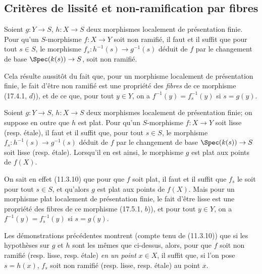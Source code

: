 
\subsection{Critères de lissité et non-ramification par fibres}
\label{IV.17.8}

\begin{proposition}[17.8.1]
\label{IV.17.8.1}
Soient $g:Y\to S$, $h:X\to S$ deux morphismes localement de présentation finie. Pour qu'un $S$-morphisme $f:X\to Y$ soit non ramifié, il faut et il suffit que pour tout $s\in S$, le morphisme $f_s:h^{-1}(s)\to g^{-1}(s)$ déduit de $f$ par le changement de base $\Spec(k(s))\to S$, soit non ramifié.
\end{proposition}

Cela résulte aussitôt du fait que, pour un morphisme localement de présentation finie, le fait d'être non ramifié est une propriété des \emph{fibres} de ce morphisme (17.4.1, $d$)), et de ce que, pour tout $y\in Y$, on a $f^{-1}(y)=f_s^{-1}(y)$ si $s=g(y)$.

\begin{proposition}[17.8.2]
\label{IV.17.8.2}
Soient $g:Y\to S$, $h:X\to S$ deux morphismes localement de présentation finie; on suppose en outre que $h$ est plat. Pour qu'un $S$-morphisme $f:X\to Y$ soit lisse (resp. étale), il faut et il suffit que, pour tout $s\in S$, le morphisme $f_s:h^{-1}(s)\to g^{-1}(s)$ déduit de $f$ par le changement de base $\Spec(k(s))\to S$ soit lisse (resp. étale). Lorsqu'il en est ainsi, le morphisme $g$ est plat aux points de $f(X)$.
\end{proposition}

On sait en effet (11.3.10) que pour que $f$ soit plat, il faut et il suffit que $f_s$ le soit pour tout $s\in S$, et qu'alors $g$ est plat aux points de $f(X)$. Mais pour un morphisme plat localement de présentation finie, le fait d'être lisse est une propriété des fibres de ce morphisme (17.5.1, $b$)), et pour tout $y\in Y$, on a $f^{-1}(y)=f_s^{-1}(y)$ si $s=g(y)$.

\begin{remark}[17.8.3]
\label{IV.17.8.3}
Les démonstrations précédentes montrent (compte tenu de (11.3.10)) que si les hypothèses sur $g$ et $h$ sont les mêmes que ci-dessus, alors, pour que $f$ soit non ramifié (resp. lisse, resp. étale) \emph{en un point} $x\in X$, il suffit que, si l'on pose $s=h(x)$, $f_s$ soit non ramifié (resp. lisse, resp. étale) au point $x$.
\end{remark}

